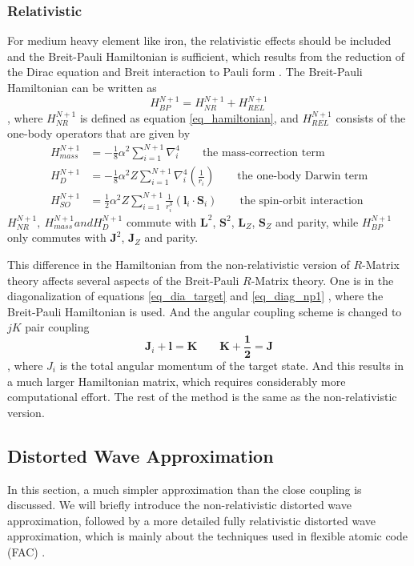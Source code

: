 \subsubsection{Relativistic} \label{sec_r_rm}
For medium heavy element like iron, the relativistic effects should be included and the Breit-Pauli Hamiltonian is sufficient, which results from the reduction of the Dirac equation and Breit interaction to Pauli form \citep{rm_2, scott_bprm}. The Breit-Pauli Hamiltonian can be written as
\begin{equation}
	H_{BP}^{N+1} = H_{NR}^{N+1} + H_{REL}^{N+1} 
\end{equation}
, where $H_{NR}^{N+1}$ is defined as equation \ref{eq_hamiltonian}, and $H_{REL}^{N+1}$ consists of the one-body operators that are given by 
\begin{subequations}
	\begin{align}
		H_{mass}^{N+1} &= -\frac{1}{8}\alpha^2 \sum_{i=1}^{N+1} \nabla_i^4 \qquad \text{the mass-correction term}\\
		H_D^{N+1} &= -\frac{1}{8}\alpha^2 Z \sum_{i=1}^{N+1} \nabla_i^4 (\frac{1}{r_i}) \qquad \text{the one-body Darwin term}\\
		H_{SO}^{N+1} &= \frac{1}{2}\alpha^2 Z \sum_{i=1}^{N+1} \frac{1}{r_i^3} (\mathbf{l}_i\cdot \mathbf{S}_i) \qquad \text{the spin-orbit interaction}
	\end{align}
\end{subequations}
$H_{NR}^{N+1},~H_{mass}^{N+1} and H_D^{N+1}$ commute with $\mathbf{L}^2$, $\mathbf{S}^2$, $\mathbf{L}_Z$,  $\mathbf{S}_Z$ and parity, while $H_{BP}^{N+1}$ only commutes with $\mathbf{J}^2$, $\mathbf{J}_Z$ and parity.

This difference in the Hamiltonian from the non-relativistic version of $R$-Matrix theory affects several aspects of the Breit-Pauli $R$-Matrix theory. One is in the diagonalization of equations \ref{eq_dia_target} and \ref{eq_diag_np1} , where the Breit-Pauli Hamiltonian is used. And the angular coupling scheme is changed to $jK$ pair coupling
\begin{equation}
	\mathbf{J}_i +\mathbf{l} = \mathbf{K} \qquad \mathbf{K+\frac{1}{2}=J}
\end{equation}
, where $J_i$ is the total angular momentum of the target state. And this results in a much larger Hamiltonian matrix, which requires considerably more computational effort. The rest of the method is the same as the non-relativistic version.



\subsection{Distorted Wave Approximation}
In this section, a much simpler approximation than the close coupling is discussed. We will briefly introduce the non-relativistic distorted wave approximation, followed by a more detailed fully relativistic distorted wave approximation, which is mainly about the techniques used in flexible atomic code (FAC) \citep{gu_2008}.
